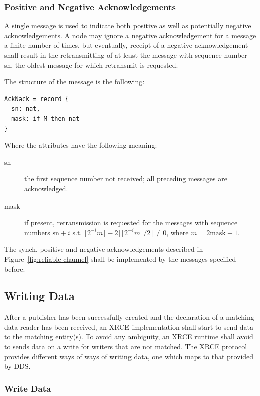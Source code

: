 \documentclass[a4paper,oneside,article]{memoir}
\begin{document}
\subsubsection{Positive and Negative Acknowledgements}

A single message is used to indicate both positive as well as potentially negative acknowledgements.
A node may ignore a negative acknowledgement for a message a finite number of times, but eventually,
receipt of a negative acknowledgement shall result in the retransmitting of at least the message
with sequence number sn, the oldest message for which retransmit is requested.

The structure of the message is the following:
\begin{verbatim}
AckNack = record {
  sn: nat,
  mask: if M then nat
}
\end{verbatim}
Where the attributes have the following meaning:
\begin{description}
\item[sn] the first sequence number not received; all preceding messages are acknowledged.
\item[mask] if present, retransmission is requested for the messages
  with sequence numbers $\mathrm{sn}+i$ s.t.
  $\lfloor 2^{-i} m \rfloor - 2 \big\lfloor \lfloor 2^{-i} m \rfloor /
  2 \big\rfloor \neq 0$, where $m = 2 \mathrm{mask} + 1$.
\end{description}

The synch, positive and negative acknowledgements described in Figure~\ref{fig:reliable-channel}
shall be implemented by the messages specified before.

\subsection{Writing Data}

After a publisher has been successfully created and the declaration of a matching data reader has
been received, an XRCE implementation shall start to send data to the matching entity(s).  To avoid
any ambiguity, an XRCE runtime shall avoid to sends data on a write for writers that are not
matched.  The XRCE protocol provides different ways of ways of writing data, one which maps to that
provided by DDS\@.

\subsubsection{Write Data}
\end{document}
